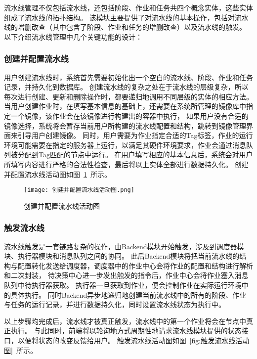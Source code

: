 流水线管理不仅包括流水线，还包括阶段、作业和任务共四个概念实体，这些实体组成了流水线的拓扑结构。
该模块主要提供了对流水线的基本操作，包括对流水线的增删改查（其中包含了阶段、作业和任务的增删改查）以及流水线的触发。
以下介绍流水线管理中几个关键功能的设计：

\subsubsection{创建并配置流水线}
用户创建流水线时，系统首先需要初始化出一个空白的流水线、阶段、作业和任务记录，并持久化到数据库。
创建流水线的复杂之处在于流水线的层级复杂，所以每次进行创建、更新和删除操作时，都要递归地调用不同层级的实体的相应方法。
当用户创建作业时，在填写基本信息的基础上，还需要在系统所管理的镜像库中指定一个镜像，该作业会在该镜像进行构建出的容器中执行，
如果用户没有合适的镜像选择，系统将会暂存当前用户所构建的流水线配置和结构，跳转到镜像管理界面来引导用户创建镜像。
同时，用户需要为作业指定合适的Tag标签，作业的运行环境可能需要在指定的服务器上运行，以满足其硬件环境要求，作业会通过消息队列被分配到Tag匹配的节点中运行。
在用户填写相应的基本信息后，系统会对用户所填写内容进行严格的合法性检查，最后将以上实体全部进行数据持久化。
创建并配置流水线活动图如图~\ref{fig:创建并配置流水线活动图}~所示。

\begin{figure}[h]
  \centering
  \texttt{[image: 创建并配置流水线活动图.png]}
  \caption{创建并配置流水线活动图}
  \label{fig:创建并配置流水线活动图}
\end{figure}

\subsubsection{触发流水线}
流水线触发是一套链路复杂的操作，由Backend模块开始触发，涉及到调度器模块、执行器模块和消息队列之间的协同。
此后Backend模块将把当前流水线的结构与配置转化发送给调度器，调度器中的作业中心会将作业的配置和结构进行解析和二次封装，
待决策中心进一步发出触发的指令后，作业中心会将作业塞入消息队列中待执行器获取。
执行器一旦获取到作业，便会控制作业在实际运行环境中的具体执行。
同时Backend异步地递归地创建当前流水线中的所有的阶段、作业与任务的运行记录，并进行数据持久化，同时设置流水线状态为执行中。

以上步骤均完成后，流水线才被真正触发，流水线中的第一个作业将会在节点中真正执行。
与此同时，前端将以轮询地方式周期性地请求流水线模块提供的状态接口，以便将状态的改变反馈给用户。
触发流水线活动图如图~\ref{fig:触发流水线活动图}~所示。

